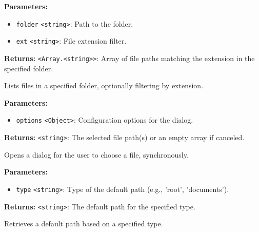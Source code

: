 \documentclass[12pt,a4paper]{article}
\begin{document}
\noindent \textbf{Parameters:}
\begin{itemize}
  \item \texttt{folder} \texttt{<string>}: Path to the folder.
  \item \texttt{ext} \texttt{<string>}: File extension filter.
\end{itemize}

\noindent \textbf{Returns:} \texttt{<Array.<string>>}: Array of file paths matching the extension in the specified folder.

\noindent Lists files in a specified folder, optionally filtering by extension.

\vspace{5mm}
\noindent {}


\noindent \textbf{Parameters:}
\begin{itemize}
  \item \texttt{options} \texttt{<Object>}: Configuration options for the dialog.
\end{itemize}

\noindent \textbf{Returns:} \texttt{<string>}: The selected file path(s) or an empty array if canceled.

\noindent Opens a dialog for the user to choose a file, synchronously.

\vspace{5mm}
\noindent {}


\noindent \textbf{Parameters:}
\begin{itemize}
  \item \texttt{type} \texttt{<string>}: Type of the default path (e.g., 'root', 'documents').
\end{itemize}

\noindent \textbf{Returns:} \texttt{<string>}: The default path for the specified type.

\noindent Retrieves a default path based on a specified type.

\vspace{5mm}
\noindent {}
\end{document}

